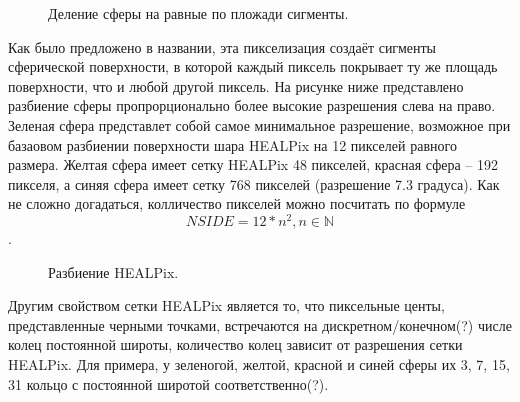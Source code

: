 \documentclass[14pt]{article} %
\begin{document}
\begin{figure}[h!]
\caption{Деление сферы на равные по пложади сигменты.}
\label{img:healpix}
\end{figure}

Как было предложено в названии, эта пикселизация создаёт сигменты сферической поверхности, в которой каждый пиксель покрывает ту же площадь поверхности, что и любой другой пиксель. На рисунке ниже представлено разбиение сферы пропрорционально более высокие разрешения слева на право. Зеленая сфера представлет собой самое минимальное разрешение, возможное при базаовом разбиении поверхности шара HEALPix на 12 пикселей равного размера. Желтая сфера имеет сетку HEALPix 48 пикселей, красная сфера -- 192 пикселя, а синяя сфера имеет сетку 768 пикселей (разрешение 7.3 градуса). Как не сложно догадаться, колличество пикселей можно посчитать по формуле $$NSIDE = 12*n^2, n \in \mathbb {N}$$.

\begin{figure}[h!]
\caption{Разбиение HEALPix.}
\label{img:healpixnasa}
\end{figure}

Другим свойством сетки HEALPix является то, что пиксельные центы, представленные черными точками, встречаются на дискретном/конечном(?) числе колец постоянной широты, количество колец зависит от разрешения сетки HEALPix. Для примера, у зеленогой, желтой, красной и синей сферы их 3, 7, 15, 31 кольцо с постоянной широтой соответственно(?).
\end{document}

